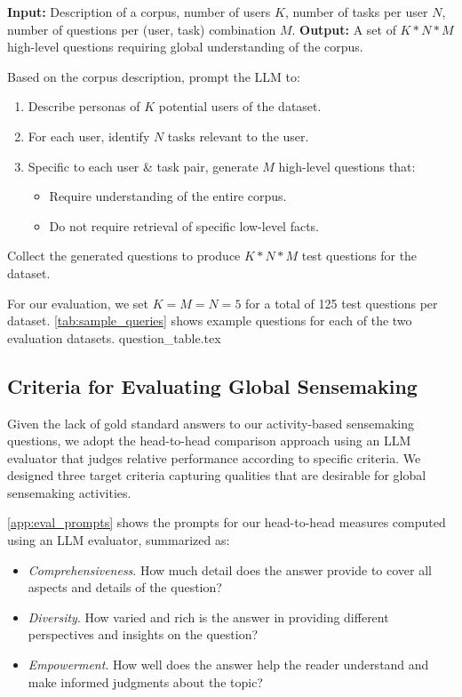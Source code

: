 \documentclass{article}
\begin{document}
\begin{algorithmic}[1]
\State \textbf{Input:} Description of a corpus, number of users $K$, number of tasks per user $N$, number of questions per (user, task) combination $M$.
\State \textbf{Output:} A set of $K*N*M$ high-level questions requiring global understanding of the corpus.

    \State Based on the corpus description, prompt the LLM to:
    \begin{enumerate}
        \item Describe personas of $K$ potential users of the dataset.
        \item For each user, identify $N$ tasks relevant to the user.
        \item Specific to each user \& task pair, generate $M$ high-level questions that:
        \begin{itemize}
            \item Require understanding of the entire corpus.
            \item Do not require retrieval of specific low-level facts.
        \end{itemize}
    \end{enumerate}
    \State Collect the generated questions to produce $K*N*M$ test questions for the dataset.
\EndProcedure
\end{algorithmic}
\noindent\hrulefill
\label{alg:question_generation}

For our evaluation, we set $K=M=N=5$ for a total of 125 test questions per dataset.
\autoref{tab:sample_queries} shows example questions for each of the two evaluation datasets.
\FloatBarrier
{question_table.tex}

\subsection{Criteria for Evaluating Global Sensemaking}
\label{sec:criteria}

Given the lack of gold standard answers to our activity-based sensemaking questions, we adopt the head-to-head comparison approach using an LLM evaluator that judges relative performance according to specific criteria.
We designed three target criteria capturing qualities that are desirable for global sensemaking activities.

\autoref{app:eval_prompts} shows the prompts for our head-to-head measures computed using an LLM evaluator, summarized as:
\begin{itemize}
    \item \emph{Comprehensiveness}. How much detail does the answer provide to cover all aspects and details of the question?
    \item \emph{Diversity}. How varied and rich is the answer in providing different perspectives and insights on the question?
    \item \emph{Empowerment}. How well does the answer help the reader understand and make informed judgments about the topic?
\end{itemize}
\end{document}
